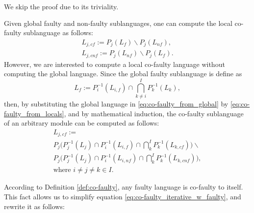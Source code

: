 \documentclass[a4paper, 10pt, conference]{ieeeconf}
\begin{document}
We skip the proof due to its triviality. 

Given global faulty and non-faulty sublanguages, one can compute the local
co-faulty sublanguage as follows:
\begin{equation}
\label{eq:co-faulty_from_global}
	\begin{array}{l}
		L_{j,cf} := P_j(L_f) \backslash P_j(L_{nf}),\\ 
		L_{j,cnf} := P_j(L_{nf}) \backslash P_j(L_{f}).	
	\end{array}
\end{equation}
However, we are interested to compute a local co-faulty
language without computing the global language. Since the global
faulty sublanguage is define as
\begin{equation}
\label{eq:co-faulty_from_locals}
	L_f := P_i^{-1}(L_{i,f}) \cap \bigcap_{k\neq
	i}^I P_k^{-1}(L_k),
\end{equation}
then, by substituting the global language in \ref{eq:co-faulty_from_global} by
\ref{eq:co-faulty_from_locals}, and by mathematical induction, the co-faulty
sublanguage of an arbitrary module can be computed as follows:
\begin{equation}
\label{eq:co-faulty_iterative_w_faulty}
	\begin{array}{l}
		L_{j,cf} := 
		\\
		P_j\Big(P_j^{-1}(L_j) \cap P_i^{-1}(L_{i,f})\cap 
		\bigcap_k^I P_k^{-1}(L_{k,cf})\Big) \backslash 
		\\
		P_j\Big(P_j^{-1}(L_j) \cap P_i^{-1}(L_{i,nf})\cap 
		\bigcap_k^I P_k^{-1}(L_{k,cnf})\Big),
		\\ 
		\textrm{where } i\neq j\neq k \in I.
	\end{array}
\end{equation}

According to Definition \ref{def:co-faulty}, any faulty language is co-faulty to
itself. This fact allows us to simplify equation
\ref{eq:co-faulty_iterative_w_faulty}, and rewrite it as follows:
\end{document}
